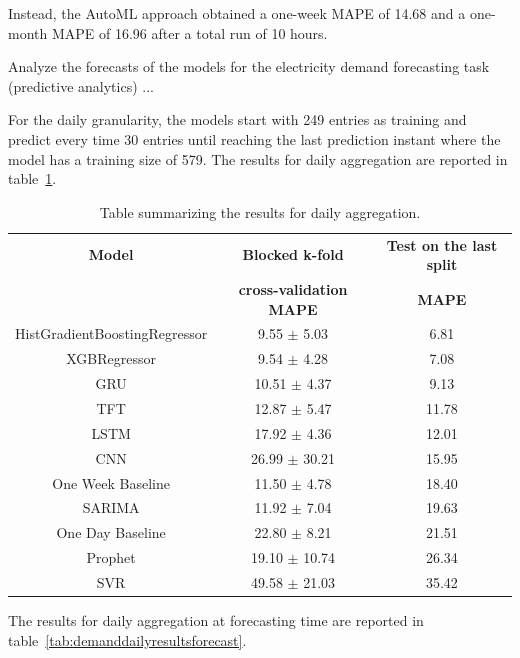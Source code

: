 
Instead, the AutoML approach obtained a one-week MAPE of 14.68 and a one-month MAPE of 16.96 after a total run of 10 hours.

Analyze the forecasts of the models for the electricity demand forecasting task (predictive analytics) ...

For the daily granularity, the models start with 249 entries as training and predict every time 30 entries until reaching the last prediction instant where the model has a training size of 579.
The results for daily aggregation are reported in table~\ref{tab:demanddailyresults}.

\begin{table}[H]
\centering
\begin{tabular}{|c|c|c|}
\hline
\textbf{Model} & \textbf{Blocked k-fold} & \textbf{Test on the last split}\\
 & \textbf{cross-validation MAPE} & \textbf{MAPE}\\
\hline
HistGradientBoostingRegressor & 9.55 $\pm$ 5.03 & 6.81\\
\hline
XGBRegressor & 9.54 $\pm$ 4.28 & 7.08\\
\hline
GRU & 10.51 $\pm$ 4.37 & 9.13\\
\hline
TFT & 12.87 $\pm$ 5.47 & 11.78\\
\hline
LSTM & 17.92 $\pm$ 4.36 & 12.01\\
\hline
CNN & 26.99 $\pm$ 30.21 & 15.95\\
\hline
One Week Baseline & 11.50 $\pm$ 4.78 & 18.40\\
\hline
SARIMA & 11.92 $\pm$ 7.04 & 19.63\\
\hline
One Day Baseline & 22.80 $\pm$ 8.21 & 21.51\\
\hline
Prophet & 19.10 $\pm$ 10.74 & 26.34\\
\hline
SVR & 49.58 $\pm$ 21.03 & 35.42\\
\hline
\end{tabular}
\caption{Table summarizing the results for daily aggregation.}
\label{tab:demanddailyresults}
\end{table}

The results for daily aggregation at forecasting time are reported in table~\ref{tab:demanddailyresultsforecast}.

